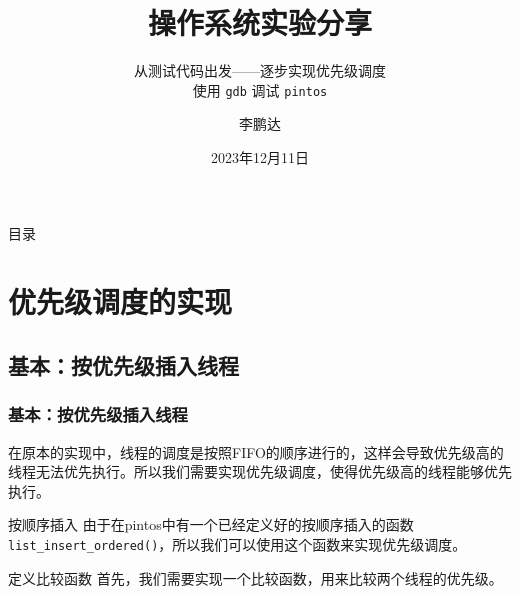 \documentclass{beamer}
\title{操作系统实验分享}
\subtitle{从测试代码出发——逐步实现优先级调度 \\ 使用 \texttt{gdb} 调试 \texttt{pintos}}
\author{李鹏达}
\date{2023年12月11日}
\begin{document}
\begin{frame}
  \titlepage
\end{frame}

\begin{frame}{目录}
  \tableofcontents
\end{frame}

\section{优先级调度的实现}

\subsection{基本：按优先级插入线程}

\begin{frame}
  \frametitle{基本：按优先级插入线程}
  在原本的实现中，线程的调度是按照FIFO的顺序进行的，这样会导致优先级高的线程无法优先执行。所以我们需要实现优先级调度，使得优先级高的线程能够优先执行。

  \framebreak

  \begin{block}{按顺序插入}
    由于在pintos中有一个已经定义好的按顺序插入的函数\texttt{list\_insert\_ordered()}，所以我们可以使用这个函数来实现优先级调度。
  \end{block}

    
    


  \begin{block}{定义比较函数}
    首先，我们需要实现一个比较函数，用来比较两个线程的优先级。
  \end{block}



\end{frame}
\end{document}
